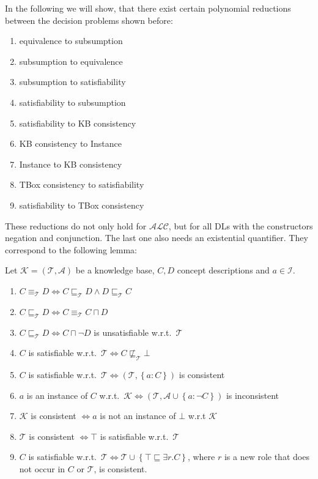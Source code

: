 \newpage
In the following we will show, that there exist certain polynomial reductions between the decision problems shown before:
\begin{enumerate}
	\item  equivalence to subsumption
	\item subsumption to equivalence
	\item subsumption to satisfiability
	\item satisfiability to subsumption
	\item satisfiability to KB consistency
	\item KB consistency to Instance
	\item Instance to KB consistency
	\item TBox consistency to satisfiability
	\item satisfiability to TBox consistency
\end{enumerate}
\begin{note}
	These reductions do not only hold for $\mathcal{ALC}$, but for all DLs with the constructors negation and conjunction.
	The last one also needs an existential quantifier.
	They correspond to the following lemma:
\end{note}

\begin{theorem}
	Let $\mathcal{K} = \left( \mathcal{T}, \mathcal{A} \right)$ be a knowledge base, 
	$C, D$ concept descriptions and $a \in \mathscr{I}$.
	\begin{enumerate}
		\item $C \equiv_{\mathcal{T}} D \iff C \sqsubseteq_{\mathcal{T}} D \land D \sqsubseteq_{\mathcal{T}} C$ 
		\item $C \sqsubseteq_{\mathcal{T}} D \iff C \equiv_{\mathcal{T}} C \sqcap D$
		\item $C \sqsubseteq_{\mathcal{T}} D \iff C \sqcap \neg D$ is unsatisfiable w.r.t.\ $\mathcal{T}$
		\item $C$ is satisfiable w.r.t.\ $\mathcal{T} \iff C \not\sqsubseteq_{\mathcal{T}} \bot$
		\item $C$ is satisfiable w.r.t.\ $\mathcal{T} \iff \left( \mathcal{T}, \left\{ a:C \right\} \right)$ is consistent
		\item $a$ is an instance of $C$ w.r.t.\ $\mathcal{K} \iff \left( \mathcal{T}, \mathcal{A} \cup \left\{ a: \neg C \right\} \right)$ is inconsistent
		\item $\mathcal{K}$ is consistent $\iff a$ is not an instance of $\bot$ w.r.t $\mathcal{K}$
		\item $\mathcal{T}$ is consistent $\iff \top$ is satisfiable w.r.t.\ $\mathcal{T}$
		\item $C$ is satisfiable w.r.t.\ $\mathcal{T} \iff \mathcal{T} \cup \left\{ \top \sqsubseteq \exists r.C \right\}$,
			where $r$ is a new role that does not occur in $C$ or $\mathcal{T}$,
			is consistent.
	\end{enumerate}
\end{theorem}

